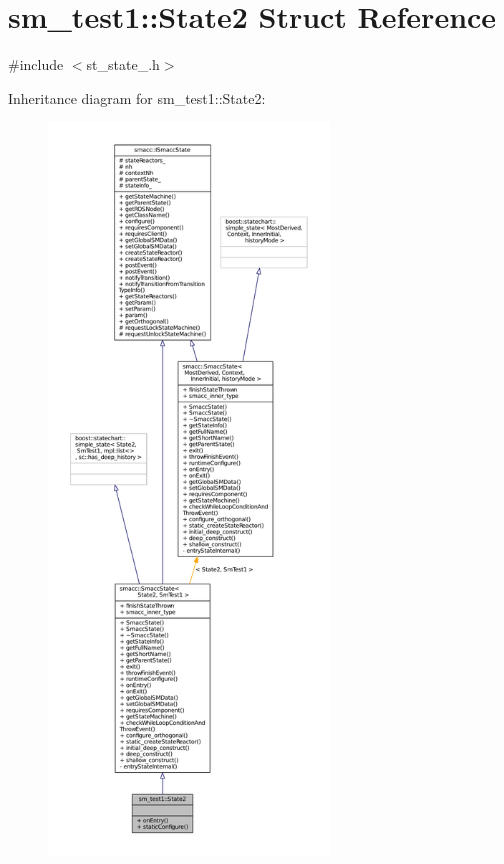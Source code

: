 \hypertarget{structsm__test1_1_1State2}{}\section{sm\+\_\+test1\+:\+:State2 Struct Reference}
\label{structsm__test1_1_1State2}


{\ttfamily \#include $<$st\+\_\+state\+\_.\+h$>$}



Inheritance diagram for sm\+\_\+test1\+:\+:State2\+:
\nopagebreak
\begin{figure}[H]
\begin{center}
\leavevmode
\includegraphics[height=550pt]{structsm__test1_1_1State2__inherit__graph}
\end{center}
\end{figure}


